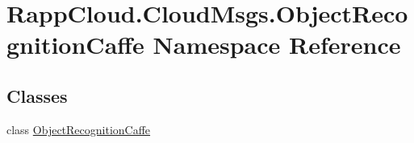 \hypertarget{namespaceRappCloud_1_1CloudMsgs_1_1ObjectRecognitionCaffe}{\section{Rapp\-Cloud.\-Cloud\-Msgs.\-Object\-Recognition\-Caffe Namespace Reference}
\label{namespaceRappCloud_1_1CloudMsgs_1_1ObjectRecognitionCaffe}
}
\subsection*{Classes}
\begin{DoxyCompactItemize}
\item 
class \hyperlink{classRappCloud_1_1CloudMsgs_1_1ObjectRecognitionCaffe_1_1ObjectRecognitionCaffe}{Object\-Recognition\-Caffe}
\end{DoxyCompactItemize}
